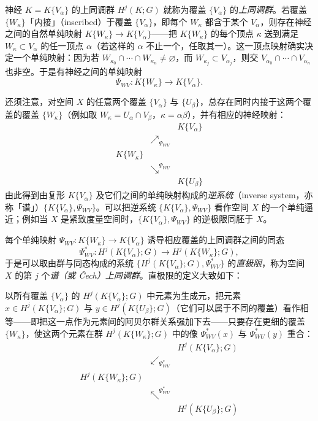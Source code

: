 神经 $K=K\{V_\alpha\}$ 的上同调群 $H^j(K;G)$ 就称为覆盖 $\{V_\alpha\}$ 的\emph{上同调群}。若覆盖 $\{W_\kappa\}$「内接」（inscribed）于覆盖 $\{V_\alpha\}$，即每个 $W_\kappa$ 都含于某个 $V_\alpha$，则存在神经之间的自然单纯映射 $K\{W_\kappa\}\to K\{V_\alpha\}$——把 $K\{W_\kappa\}$ 的每个顶点 $\kappa$ 送到满足 $W_\kappa\subset V_\alpha$ 的任一顶点 $\alpha$（若这样的 $\alpha$ 不止一个，任取其一）。这一顶点映射确实决定一个单纯映射：因为若 $W_{\kappa_0}\cap\cdots\cap W_{\kappa_n}\neq\varnothing$，而 $W_{\kappa_j}\subset V_{\alpha_j}$，则交 $V_{\alpha_0}\cap\cdots\cap V_{\alpha_n}$ 也非空。于是有神经之间的单纯映射
\[
  \Psi_{WV}\colon K\{W_\kappa\}\longrightarrow K\{V_\alpha\}.
\]

还须注意，对空间 $X$ 的任意两个覆盖 $\{V_\alpha\}$ 与 $\{U_\beta\}$，总存在同时内接于这两个覆盖的覆盖 $\{W_\kappa\}$（例如取 $W_\kappa=U_\alpha\cap V_\beta$，$\kappa=\alpha\beta$），并有相应的神经映射：
\[
\begin{array}{ccc}
  &                       & K\{V_\alpha\}\\
  & \nearrow_{\Psi_{WV}}  & \\
  K\{W_\kappa\} &         & \\
  & \searrow^{\Psi_{WU}}  & \\
  &                       & K\{U_\beta\}
\end{array}
\]
由此得到由复形 $K\{V_\alpha\}$ 及它们之间的单纯映射构成的\emph{逆系统}（inverse system，亦称「谱」）$\{K\{V_\alpha\},\Psi_{WV}\}$。可以把逆系统 $\{K\{V_\alpha\},\Psi_{WV}\}$ 看作空间 $X$ 的一个单纯逼近；例如当 $X$ 是紧致度量空间时，$\{K\{V_\alpha\},\Psi_{WV}\}$ 的逆极限同胚于 $X$。

每个单纯映射 $\Psi_{WV}\colon K\{W_\kappa\}\to K\{V_\alpha\}$ 诱导相应覆盖的上同调群之间的同态
\[
  \Psi^*_{WV}\colon H^j(K\{V_\alpha\};G)\longrightarrow H^j(K\{W_\kappa\};G),
\]
于是可以取由群与同态构成的系统 $\{H^j(K\{V_\alpha\};G),\Psi^*_{WV}\}$ 的\emph{直极限}，称为空间 $X$ 的第 $j$ 个\emph{谱（或 Čech）上同调群}。直极限的定义大致如下：

以所有覆盖 $\{V_\alpha\}$ 的 $H^j(K\{V_\alpha\};G)$ 中元素为生成元，把元素 $x\in H^j(K\{V_\alpha\};G)$ 与 $y\in H^j(K\{U_\beta\};G)$（它们可以属于不同的覆盖）看作相等——即把这一点作为元素间的阿贝尔群关系强加下去——只要存在更细的覆盖 $\{W_\kappa\}$，使这两个元素在群 $H^j(K\{W_\kappa\};G)$ 中的像 $\Psi^*_{WV}(x)$ 与 $\Psi^*_{WU}(y)$ 重合：
\[
\begin{array}{ccc}
  & & H^j(K\{V_\alpha\};G)\\
  & \swarrow_{\Psi^*_{WV}} & \\
  H^j(K\{W_\kappa\};G) & & \\
  & \nwarrow^{\Psi^*_{WU}} & \\
  & & H^j(K\{U_\beta\};G)
\end{array}
\]

